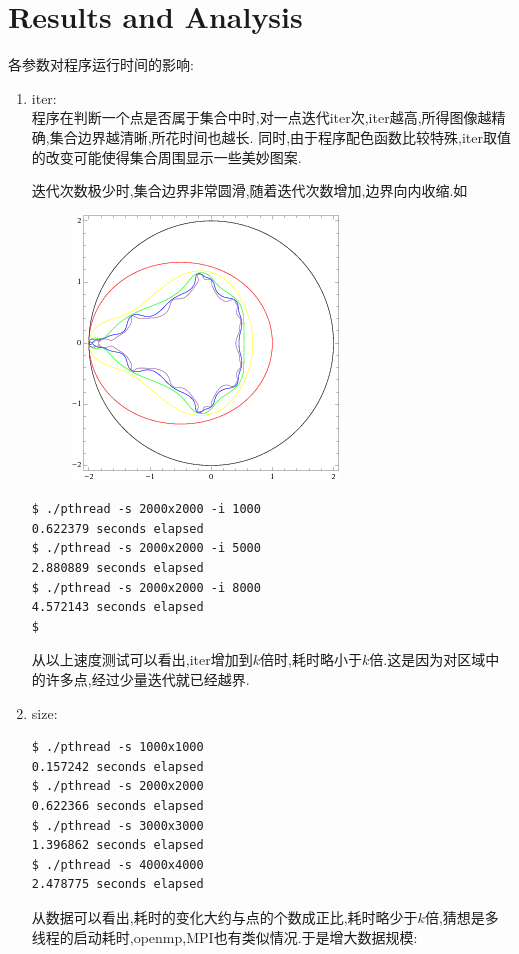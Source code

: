 \section{Results and Analysis}
各参数对程序运行时间的影响:

\begin{enumerate}
	\item iter:\\
		程序在判断一个点是否属于集合中时,对一点迭代iter次,iter越高,所得图像越精确,集合边界越清晰,所花时间也越长.
		同时,由于程序配色函数比较特殊,iter取值的改变可能使得集合周围显示一些美妙图案.
		
		迭代次数极少时,集合边界非常圆滑,随着迭代次数增加,边界向内收缩.如


		\begin{figure}[H]
			\centering
			\includegraphics[scale=1]{res/shrink.png}
			\caption{\label{fig:shrink}}
		\end{figure}

\begin{lstlisting}
$ ./pthread -s 2000x2000 -i 1000
0.622379 seconds elapsed
$ ./pthread -s 2000x2000 -i 5000
2.880889 seconds elapsed
$ ./pthread -s 2000x2000 -i 8000
4.572143 seconds elapsed
$
\end{lstlisting}
从以上速度测试可以看出,iter增加到$ k$倍时,耗时略小于$ k$倍.这是因为对区域中的许多点,经过少量迭代就已经越界.


\item size:\\
\begin{lstlisting}
$ ./pthread -s 1000x1000
0.157242 seconds elapsed
$ ./pthread -s 2000x2000
0.622366 seconds elapsed
$ ./pthread -s 3000x3000
1.396862 seconds elapsed
$ ./pthread -s 4000x4000
2.478775 seconds elapsed
\end{lstlisting}
从数据可以看出,耗时的变化大约与点的个数成正比,耗时略少于$ k$倍,猜想是多线程的启动耗时,openmp,MPI也有类似情况.于是增大数据规模:



\end{enumerate}
